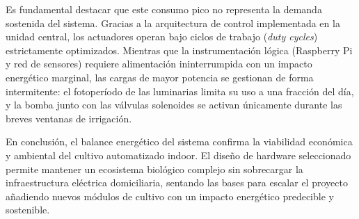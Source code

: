 Es fundamental destacar que este consumo pico no representa la demanda sostenida del sistema. Gracias a la arquitectura de control implementada en la unidad central, los actuadores operan bajo ciclos de trabajo (\textit{duty cycles}) estrictamente optimizados. Mientras que la instrumentación lógica (Raspberry Pi y red de sensores) requiere alimentación ininterrumpida con un impacto energético marginal, las cargas de mayor potencia se gestionan de forma intermitente: el fotoperíodo de las luminarias limita su uso a una fracción del día, y la bomba junto con las válvulas solenoides se activan únicamente durante las breves ventanas de irrigación. 

En conclusión, el balance energético del sistema confirma la viabilidad económica y ambiental del cultivo automatizado indoor. El diseño de hardware seleccionado permite mantener un ecosistema biológico complejo sin sobrecargar la infraestructura eléctrica domiciliaria, sentando las bases para escalar el proyecto añadiendo nuevos módulos de cultivo con un impacto energético predecible y sostenible.

